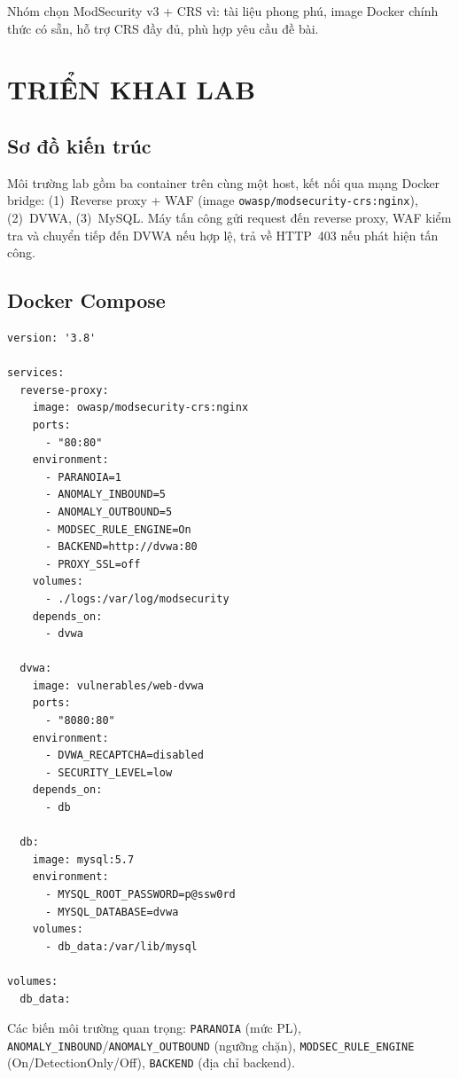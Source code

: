 \documentclass[12pt,a4paper,twoside]{report}
\begin{document}
Nhóm chọn ModSecurity v3 + CRS vì: tài liệu phong phú, image Docker chính thức có sẵn, hỗ trợ CRS đầy đủ, phù hợp yêu cầu đề bài.

\chapter{TRIỂN KHAI LAB}

\section{Sơ đồ kiến trúc}

Môi trường lab gồm ba container trên cùng một host, kết nối qua mạng Docker bridge: (1)~Reverse proxy + WAF (image \texttt{owasp/modsecurity-crs:nginx}), (2)~DVWA, (3)~MySQL. Máy tấn công gửi request đến reverse proxy, WAF kiểm tra và chuyển tiếp đến DVWA nếu hợp lệ, trả về HTTP~403 nếu phát hiện tấn công.

\section{Docker Compose}

\begin{lstlisting}[caption=docker-compose.yml,captionpos=t,basicstyle=\footnotesize\ttfamily]
version: '3.8'

services:
  reverse-proxy:
    image: owasp/modsecurity-crs:nginx
    ports:
      - "80:80"
    environment:
      - PARANOIA=1
      - ANOMALY_INBOUND=5
      - ANOMALY_OUTBOUND=5
      - MODSEC_RULE_ENGINE=On
      - BACKEND=http://dvwa:80
      - PROXY_SSL=off
    volumes:
      - ./logs:/var/log/modsecurity
    depends_on:
      - dvwa

  dvwa:
    image: vulnerables/web-dvwa
    ports:
      - "8080:80"
    environment:
      - DVWA_RECAPTCHA=disabled
      - SECURITY_LEVEL=low
    depends_on:
      - db

  db:
    image: mysql:5.7
    environment:
      - MYSQL_ROOT_PASSWORD=p@ssw0rd
      - MYSQL_DATABASE=dvwa
    volumes:
      - db_data:/var/lib/mysql

volumes:
  db_data:
\end{lstlisting}

Các biến môi trường quan trọng: \texttt{PARANOIA} (mức PL), \texttt{ANOMALY\_INBOUND}/\texttt{ANOMALY\_OUTBOUND} (ngưỡng chặn), \texttt{MODSEC\_RULE\_ENGINE} (On/DetectionOnly/Off), \texttt{BACKEND} (địa chỉ backend).
\end{document}
